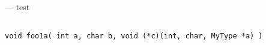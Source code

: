 \startmanpage
{}
--- test  
\startvb\begin{verbatim}

void foo1a( int a, char b, void (*c)(int, char, MyType *a) )
\end{verbatim}
\endvb

\endmanpage
